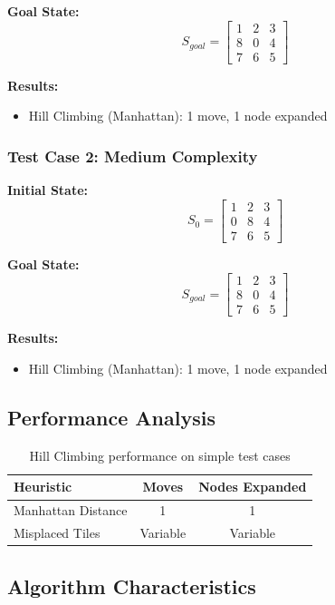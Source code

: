 \documentclass[12pt,a4paper]{article}
\begin{document}
\textbf{Goal State:}
\[
S_{goal} = \begin{bmatrix}
1 & 2 & 3 \\
8 & 0 & 4 \\
7 & 6 & 5
\end{bmatrix}
\]

\textbf{Results:}
\begin{itemize}
    \item Hill Climbing (Manhattan): 1 move, 1 node expanded
\end{itemize}

\subsubsection{Test Case 2: Medium Complexity}

\textbf{Initial State:}
\[
S_0 = \begin{bmatrix}
1 & 2 & 3 \\
0 & 8 & 4 \\
7 & 6 & 5
\end{bmatrix}
\]

\textbf{Goal State:}
\[
S_{goal} = \begin{bmatrix}
1 & 2 & 3 \\
8 & 0 & 4 \\
7 & 6 & 5
\end{bmatrix}
\]

\textbf{Results:}
\begin{itemize}
    \item Hill Climbing (Manhattan): 1 move, 1 node expanded
\end{itemize}

\subsection{Performance Analysis}

\begin{table}[h]
\centering
\begin{tabular}{|l|c|c|}
\hline
\textbf{Heuristic} & \textbf{Moves} & \textbf{Nodes Expanded} \\
\hline
Manhattan Distance & 1 & 1 \\
Misplaced Tiles & Variable & Variable \\
\hline
\end{tabular}
\caption{Hill Climbing performance on simple test cases}
\end{table}

\subsection{Algorithm Characteristics}
\end{document}
